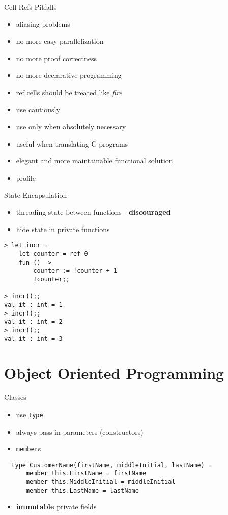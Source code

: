 \documentclass{beamer}
\begin{document}
\begin{frame}{Cell Refs Pitfalls}
  \begin{itemize}[<+->]
    \item aliasing problems
    \item no more easy parallelization
    \item no more proof correctness
    \item no more declarative programming
    \item ref cells should be treated like \textit{fire}
    \item use cautiously
    \item use only when absolutely necessary
    \pause
    \item useful when translating C programs
    \item elegant and more maintainable functional solution
    \item profile
  \end{itemize}
\end{frame}

\begin{frame}[fragile]{State Encapsulation}
  \begin{itemize}[<+->]
    \item threading state between functions - \textbf{discouraged}
    \item hide state in private functions
  \end{itemize}
  \pause
  \begin{verbatim}
> let incr =
    let counter = ref 0
    fun () ->
        counter := !counter + 1
        !counter;;

> incr();;
val it : int = 1
> incr();;
val it : int = 2
> incr();;
val it : int = 3
  \end{verbatim}
\end{frame}

\section{Object Oriented Programming}
\frame{\tableofcontents[currentsection]}

\begin{frame}[fragile]{Classes}
  \begin{itemize}[<+->]
    \item use \texttt{type}
    \item always pass in parameters (constructors)
    \item \texttt{member}s
  \end{itemize}
  \pause
  \begin{verbatim}
  type CustomerName(firstName, middleInitial, lastName) =
      member this.FirstName = firstName
      member this.MiddleInitial = middleInitial
      member this.LastName = lastName
  \end{verbatim}
  \pause
  \begin{itemize}
    \item \textbf{immutable} private fields
  \end{itemize}
\end{frame}
\end{document}
